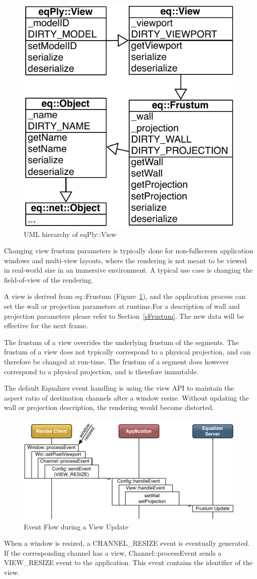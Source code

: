\documentclass[10pt,a4]{scrartcl}
\newcommand{\fig}[1]{Figure~\ref{#1}}
\newcommand{\sref}[1]{Section~\ref{#1}}
\begin{document}
\begin{figure}
  \vspace{-2ex}
  \includegraphics[width=.382\textwidth]{images/viewUML.pdf}
  {\caption{\label{fViewUML}UML hierarchy of \textsf{eqPly::View}}}
  \vspace{-5ex}
\end{figure}
Changing view frustum parameters is typically done for non-fullscreen
application windows and multi-view layouts, where the rendering is not
meant to be viewed in real-world size in an immersive environment. A
typical use case is changing the field-of-view of the rendering.

A view is derived from \textsf{eq::Frustum} (\fig{fViewUML}), and the
application process can set the wall or projection parameters at
runtime.For a description of wall and projection parameters please refer
to \sref{sFrustum}. The new data will be effective for the next frame.

The frustum of a view overrides the underlying frustum of the
segments. The frustum of a view does not typically correspond to a
physical projection, and can therefore be changed at run-time. The
frustum of a segment does however correspond to a physical projection,
and is therefore immutable.

The default Equalizer event handling is using the view API to maintain
the aspect ratio of destination channels after a window resize. Without
updating the wall or projection description, the rendering would become
distorted.

\begin{figure}
  \includegraphics[width=.618\textwidth]{images/viewUpdate.pdf}
  {\caption{\label{fViewUpdate}Event Flow during a View Update}}
\end{figure}
When a window is resized, a \textsf{CHANNEL\_RESIZE} event is eventually
generated. If the corresponding channel has a view,
\textsf{Channel::processEvent} sends a \textsf{VIEW\_RESIZE} event to
the application. This event contains the identifier of the view. 
\end{document}
